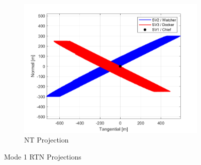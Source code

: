 \begin{figure}[H]
\begin{subfigure}[b]{0.32\linewidth}
        \includegraphics[width=\linewidth]{sim/figures/PS5/mode_1_RTN.png_NT.png}
        \caption{NT Projection}
        \label{fig:mode_1_nt}
    \end{subfigure}
    \caption{Mode 1 RTN Projections}
    \label{fig:mode_1_rtn}
\end{figure}

